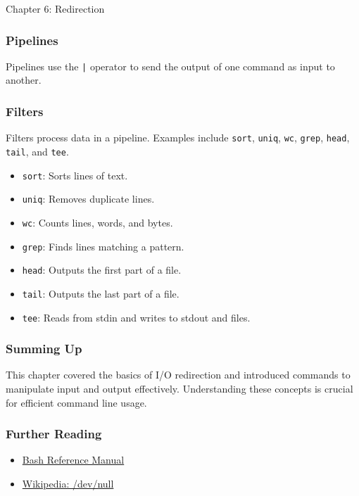 \begin{notes}{Chapter 6: Redirection}
    \subsubsection*{Pipelines}

    Pipelines use the \texttt{|} operator to send the output of one command as input to another.
    \begin{highlight}
    \end{highlight}

    \subsubsection*{Filters}

    Filters process data in a pipeline. Examples include \texttt{sort}, \texttt{uniq}, \texttt{wc}, \texttt{grep}, \texttt{head}, \texttt{tail}, and \texttt{tee}.
    \begin{highlight}
    \begin{itemize}
        \item \texttt{sort}: Sorts lines of text.
        \item \texttt{uniq}: Removes duplicate lines.
        \item \texttt{wc}: Counts lines, words, and bytes.
        \item \texttt{grep}: Finds lines matching a pattern.
        \item \texttt{head}: Outputs the first part of a file.
        \item \texttt{tail}: Outputs the last part of a file.
        \item \texttt{tee}: Reads from stdin and writes to stdout and files.
    \end{itemize}
    \end{highlight}

    \subsubsection*{Summing Up}

    This chapter covered the basics of I/O redirection and introduced commands to manipulate input and output effectively. Understanding these concepts is crucial for efficient command line usage.

    \subsubsection*{Further Reading}

    \begin{itemize}
        \item \href{http://www.gnu.org/software/bash/manual/bashref.html}{Bash Reference Manual}
        \item \href{http://en.wikipedia.org/wiki/Dev/null}{Wikipedia: /dev/null}
    \end{itemize}
\end{notes}

